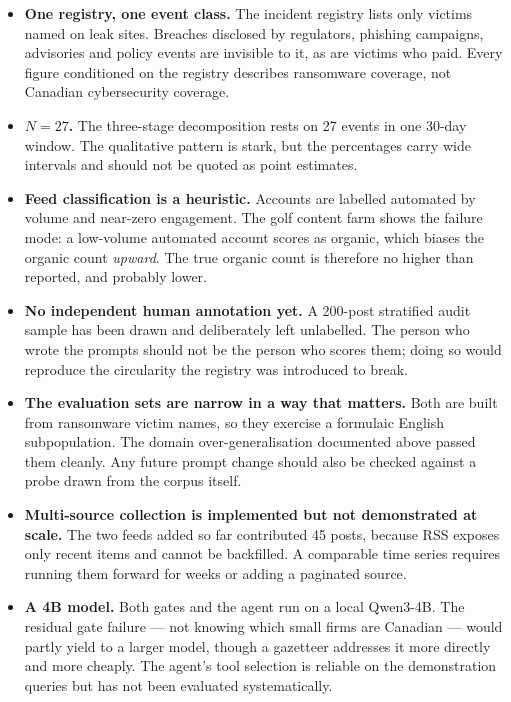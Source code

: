 \documentclass[11pt]{article}
\begin{document}
\begin{itemize}[leftmargin=1.4em,itemsep=3pt]
\item \textbf{One registry, one event class.} The incident registry lists only
victims named on leak sites. Breaches disclosed by regulators, phishing
campaigns, advisories and policy events are invisible to it, as are victims who
paid. Every figure conditioned on the registry describes ransomware coverage,
not Canadian cybersecurity coverage.
\item \textbf{$N = 27$.} The three-stage decomposition rests on 27 events in
one 30-day window. The qualitative pattern is stark, but the percentages carry
wide intervals and should not be quoted as point estimates.
\item \textbf{Feed classification is a heuristic.} Accounts are labelled
automated by volume and near-zero engagement. The golf content farm shows the
failure mode: a low-volume automated account scores as organic, which biases
the organic count \emph{upward}. The true organic count is therefore no higher
than reported, and probably lower.
\item \textbf{No independent human annotation yet.} A 200-post stratified audit
sample has been drawn and deliberately left unlabelled. The person who wrote
the prompts should not be the person who scores them; doing so would reproduce
the circularity the registry was introduced to break.
\item \textbf{The evaluation sets are narrow in a way that matters.} Both are
built from ransomware victim names, so they exercise a formulaic English
subpopulation. The domain over-generalisation documented above passed them
cleanly. Any future prompt change should also be checked against a probe drawn
from the corpus itself.
\item \textbf{Multi-source collection is implemented but not demonstrated at
scale.} The two feeds added so far contributed 45 posts, because RSS exposes
only recent items and cannot be backfilled. A comparable time series requires
running them forward for weeks or adding a paginated source.
\item \textbf{A 4B model.} Both gates and the agent run on a local Qwen3-4B.
The residual gate failure --- not knowing which small firms are Canadian ---
would partly yield to a larger model, though a gazetteer addresses it more
directly and more cheaply. The agent's tool selection is reliable on the
demonstration queries but has not been evaluated systematically.
\end{itemize}
\end{document}
